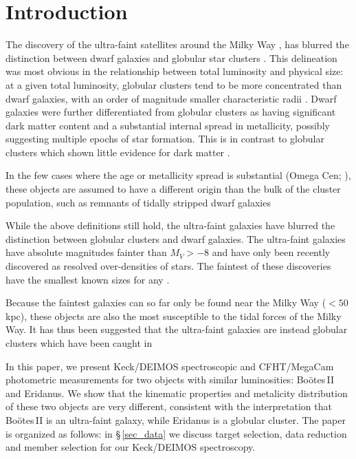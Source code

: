 \documentclass{../tex_files/emulateapj}
\begin{document}
\section{Introduction}\label{intro_sec}
\renewcommand{\thefootnote}{\fnsymbol{footnote}}



The discovery of the ultra-faint satellites around the Milky Way
\citep{2007ApJ...670..313S}, has blurred the distinction between dwarf
galaxies and globular star clusters \citep{2012AJ....144...76W}.  This
delineation was most obvious in the relationship between total
luminosity and physical size: at a given total luminosity, globular
clusters tend to be more concentrated than dwarf galaxies, with an order of
magnitude smaller characteristic radii \citep{belokurov06a}.  Dwarf
galaxies were further differentiated from globular clusters as having
significant dark matter content and a substantial internal spread in
metallicity, possibly suggesting multiple epochs of star formation.
This is in contrast to globular clusters which shown little evidence
for dark matter \citep{2011ApJ...743..167B}.

In the few cases where the age or metallicity spread is
substantial (Omega Cen; ), these objects are assumed to have a
different origin than the bulk of the cluster population, such as
remnants of tidally stripped dwarf galaxies

While the above definitions still hold, the ultra-faint galaxies have
blurred the distinction between globular clusters and dwarf galaxies.
The ultra-faint galaxies have absolute magnitudes fainter than $M_V >
-8$ and have only been recently discovered as resolved over-densities
of stars.  The faintest of these discoveries have the smallest known
sizes for any .

Because the faintest galaxies can so far only be found near the Milky
Way ($<50$\,kpc), these objects are also the most susceptible to the
tidal forces of the Milky Way.  It has thus been suggested that the
ultra-faint galaxies are instead globular clusters which have been
caught in




In this paper, we present Keck/DEIMOS spectroscopic and CFHT/MegaCam
photometric measurements for two objects with similar luminosities:
Bo\"otes\,II and Eridanus.  We show that the kinematic properties and
metalicity distribution of these two objects are very different,
consistent with the interpretation that Bo\"otes\,II is an ultra-faint
galaxy, while Eridanus is a globular cluster.  The paper is organized as
follows: in \S\,\ref{sec_data} we discuss target selection, data
reduction and member selection for our Keck/DEIMOS spectroscopy.
\end{document}
